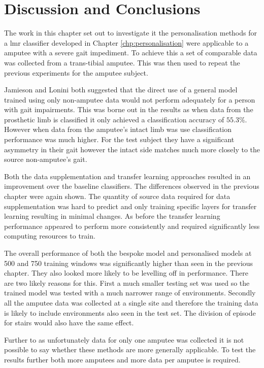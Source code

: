 \section{Discussion and Conclusions}
\label{sec:amputee-discussion}
The work in this chapter set out to investigate it the personalisation methods for a \acrshort{lmr} classifier developed in Chapter \ref{chp:personalisation} were applicable to a amputee with a severe gait impediment. To achieve this a set of comparable data was collected from a trans-tibial amputee. This was then used to repeat the previous experiments for the amputee subject.

Jamieson and Lonini both suggested that the direct use of a general model trained using only non-amputee data would not perform adequately for a person with gait impairments\cite{Lonini2016, Jamieson2021}. This was borne out in the results as when data from the prosthetic limb is classified it only achieved a classification accuracy of $55.3\%$. However when data from the amputee's intact limb was use classification performance was much higher. For the test subject they have a significant asymmetry in their gait however the intact side matches much more closely to the source non-amputee's gait.

Both the data supplementation and transfer learning approaches resulted in an improvement over the baseline classifiers. The differences observed in the previous chapter were again shown. The quantity of source data required for data supplementation was hard to predict and only training specific layers for transfer learning resulting in minimal changes. As before the transfer learning performance appeared to perform more consistently and required significantly less computing resources to train.

The overall performance of both the bespoke model and personalised models at 500 and 750 training windows was significantly higher than seen in the previous chapter. They also looked more likely to be levelling off in performance. There are two likely reasons for this. First a much smaller testing set was used so the trained model was tested with a much narrower range of environments. Secondly all the amputee data was collected at a single site and therefore the training data is likely to include environments also seen in the test set. The division of episode for stairs would also have the same effect. 

Further to as unfortunately data for only one amputee was collected it is not possible to say whether these methods are more generally applicable. To test the results further both more amputees and more data per amputee is required. 

